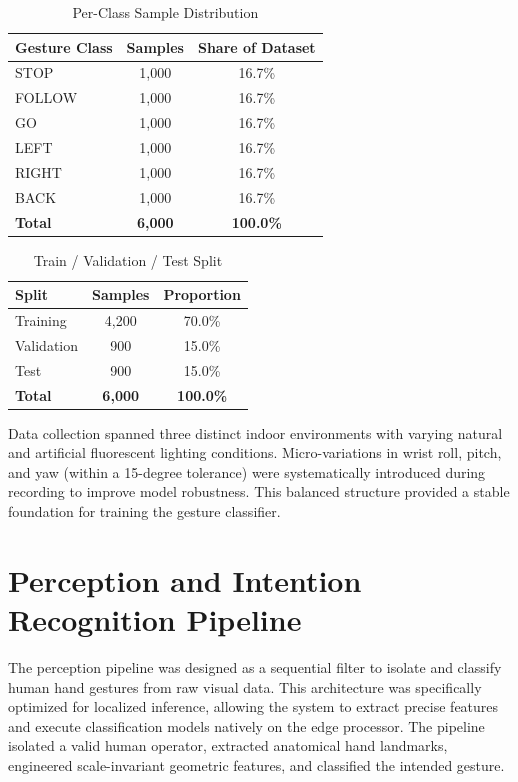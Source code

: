 \begin{table}[H]
\centering
\caption{Per-Class Sample Distribution}
\label{tab:class_distribution}
\begin{tabular}{|l|c|c|}
\hline
\textbf{Gesture Class} & \textbf{Samples} & \textbf{Share of Dataset} \\
\hline
STOP & 1,000 & 16.7\% \\
\hline
FOLLOW & 1,000 & 16.7\% \\
\hline
GO & 1,000 & 16.7\% \\
\hline
LEFT & 1,000 & 16.7\% \\
\hline
RIGHT & 1,000 & 16.7\% \\
\hline
BACK & 1,000 & 16.7\% \\
\hline
\textbf{Total} & \textbf{6,000} & \textbf{100.0\%} \\
\hline
\end{tabular}
\end{table}

\begin{table}[H]
\centering
\caption{Train / Validation / Test Split}
\label{tab:dataset_split}
\begin{tabular}{|l|c|c|}
\hline
\textbf{Split} & \textbf{Samples} & \textbf{Proportion} \\
\hline
Training & 4,200 & 70.0\% \\
\hline
Validation & 900 & 15.0\% \\
\hline
Test & 900 & 15.0\% \\
\hline
\textbf{Total} & \textbf{6,000} & \textbf{100.0\%} \\
\hline
\end{tabular}
\end{table}

Data collection spanned three distinct indoor environments with varying natural and artificial fluorescent lighting conditions. Micro-variations in wrist roll, pitch, and yaw (within a 15-degree tolerance) were systematically introduced during recording to improve model robustness. This balanced structure provided a stable foundation for training the gesture classifier.

\section{Perception and Intention Recognition Pipeline}
The perception pipeline was designed as a sequential filter to isolate and classify human hand gestures from raw visual data. This architecture was specifically optimized for localized inference, allowing the system to extract precise features and execute classification models natively on the edge processor. The pipeline isolated a valid human operator, extracted anatomical hand landmarks, engineered scale-invariant geometric features, and classified the intended gesture.

